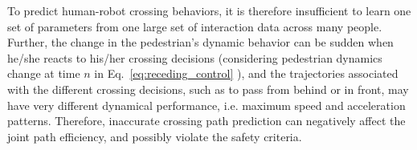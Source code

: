 \documentclass[conference]{IEEEtran}
\begin{document}
To predict human-robot crossing behaviors, it is therefore insufficient to learn
one set of parameters from one large set of interaction data across many people. 
Further, the change in the pedestrian's dynamic behavior can be sudden when he/she reacts
to his/her crossing decisions
(considering 
pedestrian dynamics change at time $n$ in Eq.~\ref{eq:receding_control}
), and the 
trajectories associated with the different crossing decisions, such as to pass 
from behind or in front,
may have very different dynamical performance, i.e. maximum speed and 
acceleration patterns.
Therefore, inaccurate
crossing path prediction
can negatively affect the joint path efficiency, and possibly violate the 
safety criteria. 




\end{document}
